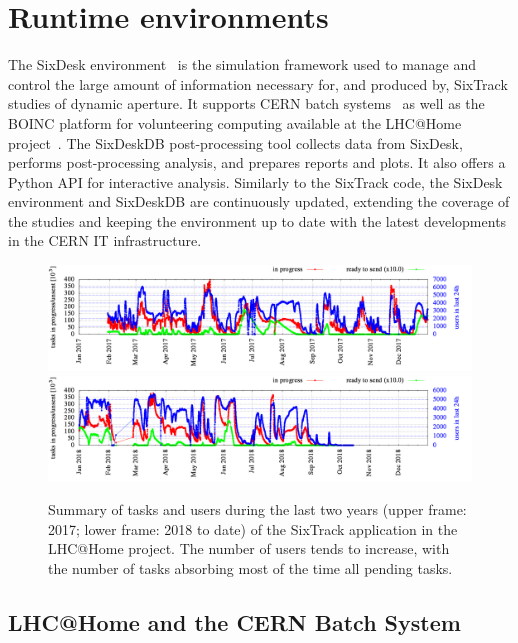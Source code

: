 \documentclass[a4paper,
              ]{jacow}
\begin{document}
\section{Runtime environments}

The SixDesk environment~\cite{sixdesk} is the simulation framework used to manage and control the large amount of information necessary for, and produced by, SixTrack studies of dynamic aperture. It supports CERN batch systems~\cite{cernbatch} as well as the BOINC platform for volunteering computing available at the LHC@Home project~\cite{lhcathome}. The SixDeskDB post-processing tool collects data from SixDesk, performs post-processing analysis, and prepares reports and plots. It also offers a Python API for interactive analysis. Similarly to the SixTrack code, the SixDesk environment and SixDeskDB are continuously updated, extending the coverage of the studies and keeping the environment up to date with the latest developments in the CERN IT infrastructure.



\begin{figure}[tbh]
\centering
 \includegraphics[width=\textwidth]{sixtrackOverview_2017.png}
 \includegraphics[width=\textwidth]{sixtrackOverview_2018.png}
  \caption{Summary of tasks and users during the last two years (upper frame: 2017; lower frame: 2018 to date) of the SixTrack application in the LHC@Home project. The number of users tends to increase, with the number of tasks absorbing most of the time all pending tasks.}
 \label{fig:boinc}
\end{figure}

\subsection{LHC@Home and the CERN Batch System}
\end{document}
